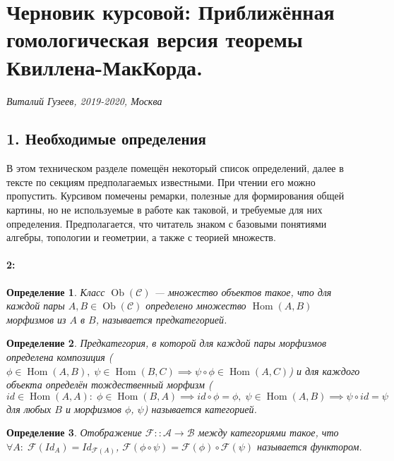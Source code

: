 \documentclass[a4paper,12pt]{report}
\newtheorem{definition}{Определение}
\begin{document}
	\section*{Черновик курсовой: Приближённая гомологическая версия теоремы Квиллена-МакКорда.}
  \textit{Виталий Гузеев, 2019-2020, Москва}

  \hrulefill

\subsection*{1. Необходимые определения}
В этом техническом разделе помещён некоторый список определений, далее в тексте по секциям предполагаемых известными. При чтении его можно пропустить. Курсивом помечены ремарки, полезные для формирования общей картины, но не используемые в работе как таковой, и требуемые для них определения. Предполагается, что читатель знаком с базовыми понятиями алгебры, топологии и геометрии, а также с теорией множеств.\\
\paragraph*{2:}

\begin{definition}
Класс $\operatorname{Ob}(\mathcal{C})$ --- множество объектов такое, что для каждой пары $A,B \in \operatorname{Ob}(\mathcal{C})$ определено множество $\operatorname{Hom}(A,B)$ морфизмов из $A$ в $B$, называется предкатегорией.
\end{definition}

\begin{definition}
Предкатегория, в которой для каждой пары морфизмов определена композиция ($\phi \in \operatorname{Hom}(A,B),\; \psi \in \operatorname{Hom}(B,C) \implies \psi \circ \phi \in \operatorname{Hom}(A,C)$) и для каждого объекта определён тождественный морфизм
($id \in \operatorname{Hom}(A,A):\; \phi \in \operatorname{Hom}(B,A) \implies id \circ \phi = \phi,\; \psi \in \operatorname{Hom}(A,B) \implies \psi \circ id = \psi$ для любых $B$ и морфизмов $\phi$, $\psi$) называется категорией.\\
\end{definition}

\begin{definition}
Отображение $\mathcal{F} :: \mathcal{A} \to \mathcal{B}$ между категориями такое, что $\forall A:\;\mathcal{F}(Id_A) = Id_{\mathcal{F}(A)}$,
$\mathcal{F}(\phi \circ \psi) = \mathcal{F}(\phi) \circ \mathcal{F}(\psi)$ называется функтором.
\end{definition}
\end{document}
